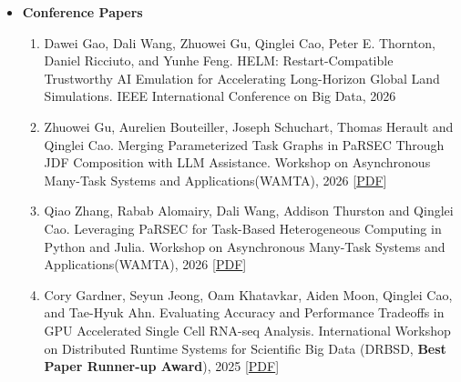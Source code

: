 \documentclass{resume} %
\let\OrigRSection\rSection
\let\OrigEndRSection\endrSection
\let\OrigMakeUppercase\MakeUppercase
\renewenvironment{rSection}[1]{
    \renewcommand{\MakeUppercase}[1]{\textcolor{blue}{\OrigMakeUppercase{##1}}}%
    \OrigRSection{#1}%
}{%
    \OrigEndRSection%
}
\begin{document}
\begin{rSection}{\faTrophy ~AWARDS \& GRANTS}
\end{rSection}

%


\newcommand{\qinglei}{{\bf Qinglei Cao}}

\begin{rSection}{\faBook~Publications}

  \begin{itemize}%
    \setlength{\itemindent}{-.2in}
    \item {\color{cyan} \bf Conference Papers}
  
  \begin{enumerate}[leftmargin=8pt, align=left]%
    \item Dawei Gao, Dali Wang, Zhuowei Gu, Qinglei Cao, Peter E. Thornton, Daniel Ricciuto, and Yunhe Feng. HELM: Restart-Compatible Trustworthy AI Emulation for Accelerating Long-Horizon Global Land Simulations. IEEE International Conference on Big Data, 2026
    \item Zhuowei Gu, Aurelien Bouteiller, Joseph Schuchart, Thomas Herault and Qinglei Cao. Merging Parameterized Task Graphs in PaRSEC Through JDF Composition with LLM Assistance. Workshop on Asynchronous Many-Task Systems and Applications(WAMTA), 2026 \hfill[\href{https://qingleicao.com/papers/2026-wamta-Merging Parameterized Task Graphs in PaRSEC Through JDF Composition with LLM Assistance.pdf}{PDF}]
    \item Qiao Zhang, Rabab Alomairy, Dali Wang, Addison Thurston and Qinglei Cao. Leveraging PaRSEC for Task-Based Heterogeneous Computing in Python and Julia. Workshop on Asynchronous Many-Task Systems and Applications(WAMTA), 2026 \hfill[\href{https://qingleicao.com/papers/2026-wamta-Leveraging PaRSEC for Task-Based Heterogeneous Computing in Python and Julia.pdf}{PDF}]
    \item Cory Gardner, Seyun Jeong, Oam Khatavkar, Aiden Moon, Qinglei Cao, and Tae-Hyuk Ahn. Evaluating Accuracy and Performance Tradeoffs in GPU Accelerated Single Cell RNA-seq Analysis. International Workshop on Distributed Runtime Systems for Scientific Big Data (DRBSD, {\bf Best Paper Runner-up Award}), 2025 \hfill[\href{https://qingleicao.com/papers/Evaluating Accuracy and Performance Tradeoffs in GPU Accelerated Single Cell RNA-seq Analysis.pdf}{PDF}]

\end{enumerate}
\end{itemize}
\end{rSection}
\end{document}
